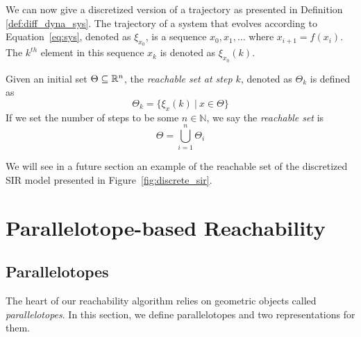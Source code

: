 We can now give a discretized version of a trajectory as presented in Definition \ref{def:diff_dyna_sys}. The trajectory of a system that evolves according to Equation~\ref{eq:sys}, denoted as $\xi_{x_0}$, is a sequence $x_0, x_1, \ldots $ where $x_{i+1} = f(x_i)$.
%
The $k^{th}$ element in this sequence $x_k$ is denoted as $\xi_{x_0}(k)$.

\begin{definition}
Given an initial set $\Theta \subseteq {\mathbb{R}}^n$, the \emph{reachable set at step $k$}, denoted as $\Theta_k$ is defined as
\begin{equation}
  \Theta_k = \{ \xi_x(k)\: | \: x \in \Theta\}
\label{eq:reachset}
\end{equation}
If we set the number of steps to be some $n \in \mathbb{N}$, we say the \emph{reachable set} is
\begin{equation}
  \Theta = \bigcup_{i=1}^n \Theta_i
\end{equation}
\end{definition}
%
\noindent We will see in a future section an example of the reachable set of the discretized SIR model presented in Figure~\ref{fig:discrete_sir}.

\section{Parallelotope-based Reachability}
\subsection{Parallelotopes}
\label{sec:parallelotope}
The heart of our reachability algorithm relies on geometric objects called \emph{parallelotopes}. In this section, we define parallelotopes and two representations for them.

